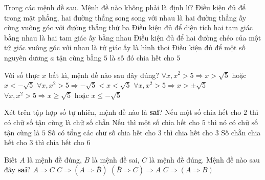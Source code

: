 \begin{ex}%
	Trong các mệnh dề sau.  Mệnh đề nào không phải là định lí?
	\choice 
		{Điều kiện đủ để trong mặt phẳng, hai đường thẳng song song với nhau là hai đường thẳng ấy  cùng vuông góc với đường thẳng thứ ba}
		{Điều kiện đủ để diện tích hai tam giác bằng nhau là hai  tam giác ấy bằng nhau}
		{Điều kiện đủ để  hai đường chéo của một tứ giác vuông góc với nhau là tứ giác ấy là hình thoi}
		{\True Điều kiện đủ để một số nguyên dương $a$ tận cùng bằng $5$ là số  đó chia hết cho $5$}
\end{ex}

\begin{ex}%
	Với  số thực $x$ bất kì, mệnh đề nào sau đây đúng?
	 \choice
		 {\True $\forall x,x^2>5\Rightarrow x>\sqrt{5} $ hoặc $x<-\sqrt{5}$}
		{$  \forall x,x^2>5\Rightarrow -\sqrt{5}<x<\sqrt{5}$}
		{$\forall  x,x^2>5\Rightarrow x>\pm \sqrt{5}$}
		{$\forall x,x^2>5\Rightarrow x\ge  \sqrt{5}$ hoặc $x\leq -\sqrt{5}$}
\end{ex}

\begin{ex}%
	Xét trên tập hợp số tự nhiên, mệnh đề nào là  \textbf{sai}?
	 \choice
		{Nếu một số chia hết cho $2$ thì có chữ số tận cùng  là chữ số chẵn}
		{\True Nếu thì một số chia hết cho $5$  thì nó có chữ số tận cùng là $5$}
		{Số có tổng các chữ số chia hết cho $3$ thì chia hết cho  $3$}
		 {Số chẵn chia hết cho $3$ thì chia hết cho $6$}
\end{ex}

\begin{ex}%
	Biết $A$ là mệnh đề đúng, $B$ là mệnh đề sai, $C$ là mệnh đề đúng. Mệnh đề nào  sau đây \textbf{sai}?
	 \choice
		{$A\Rightarrow C$} 
		{$C\Rightarrow (A\Rightarrow  \overline{B})$}
		{$(\overline{B}\Rightarrow C)\Rightarrow A$} 
		{\True  $C\Rightarrow (A\Rightarrow B)$}
\end{ex}

